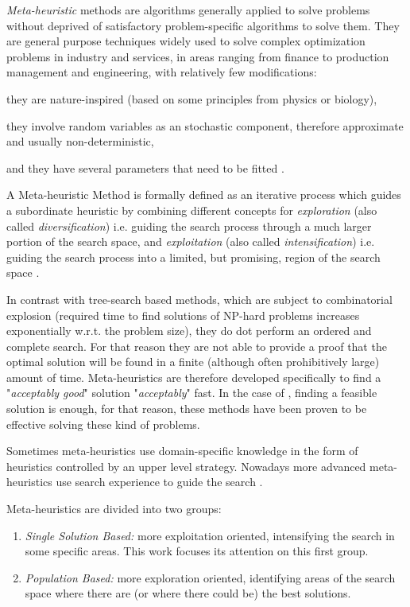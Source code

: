 {\it Meta-heuristic} methods are algorithms generally applied to solve problems without deprived of satisfactory problem-specific algorithms to solve them. They are general purpose techniques widely used to solve complex optimization problems in industry and services, in areas ranging from finance to production management and engineering, with relatively few modifications: \begin{inparaenum}[i)] \item they are nature-inspired (based on some principles from physics or biology), \item they involve random variables as an stochastic component, therefore approximate and usually non-deterministic, \item and they have several parameters that need to be fitted \cite{Dreo2006}.\end{inparaenum} 

A Meta-heuristic Method is formally defined as an iterative process which guides a subordinate heuristic by combining different concepts for \textit{exploration} (also called \textit{diversification}) i.e. guiding the search process through a much larger portion of the search space, and \textit{exploitation} (also called \textit{intensification}) i.e. guiding the search process into a limited, but promising, region of the search space \cite{Osman1996}.

In contrast with tree-search based methods, which are subject to combinatorial explosion (required time to find solutions of NP-hard problems increases exponentially w.r.t. the problem size), they do dot perform an ordered and complete search. For that reason they are not able to provide a proof that the optimal solution will be found in a finite (although often prohibitively large) amount of time. Meta-heuristics are therefore developed specifically to find a "\textit{acceptably good}" solution "\textit{acceptably}" fast. In the case of \csps, finding a feasible solution is enough, for that reason, these methods have been proven to be effective solving these kind of problems.

Sometimes meta-heuristics use domain-specific knowledge in the form of heuristics controlled by an upper level strategy. Nowadays more advanced meta-heuristics use search experience to guide the search \cite{Blum2003}.

Meta-heuristics are divided into two groups: %
\begin{enumerate}%
    \item {\it Single Solution Based:} more exploitation oriented, intensifying the search in some specific areas. This work focuses its attention on this first group.
    \item {\it Population Based:} more exploration oriented, identifying areas of the search space where there are (or where there could be) the best solutions. %
\end{enumerate} %

